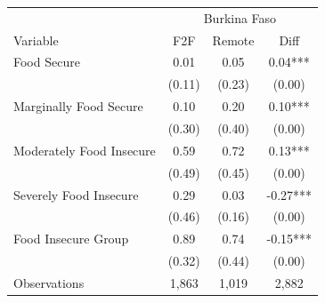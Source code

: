 \begin{tabular}{l*{3}c}
\hline\hline
 & \multicolumn{3}{c}{Burkina Faso}\\ 
Variable & F2F & Remote & Diff \\
\hline
Food Secure&0.01&0.05&0.04***\\
&(0.11)&(0.23)&(0.00)\\
Marginally Food Secure&0.10&0.20&0.10***\\
&(0.30)&(0.40)&(0.00)\\
Moderately Food Insecure&0.59&0.72&0.13***\\
&(0.49)&(0.45)&(0.00)\\
Severely Food Insecure&0.29&0.03&-0.27***\\
&(0.46)&(0.16)&(0.00)\\
Food Insecure Group&0.89&0.74&-0.15***\\
&(0.32)&(0.44)&(0.00)\\
\hline
Observations & 1,863 & 1,019 & 2,882 \\
\hline\hline
\end{tabular}
